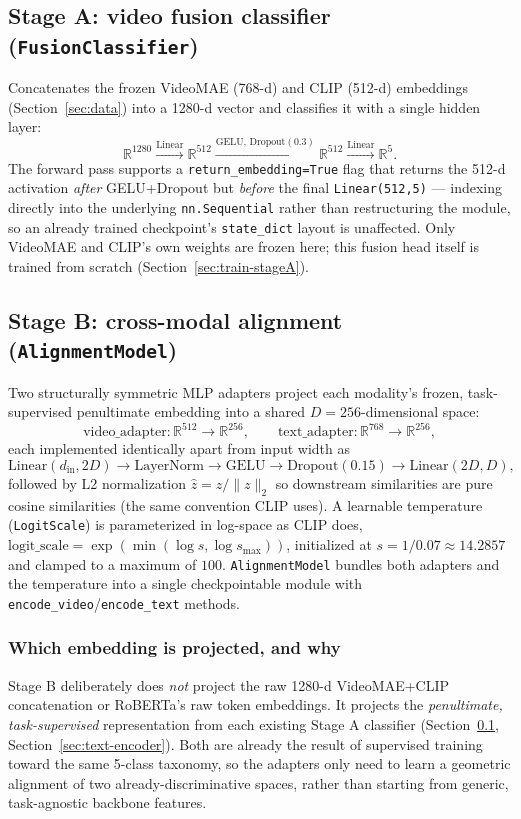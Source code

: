 \documentclass[11pt]{article}
\begin{document}
\subsection{Stage A: video fusion classifier (\texttt{FusionClassifier})}
\label{sec:stageA-video}
Concatenates the frozen VideoMAE (768-d) and CLIP (512-d) embeddings (Section~\ref{sec:data}) into
a 1280-d vector and classifies it with a single hidden layer:
\[
\mathbb{R}^{1280} \xrightarrow{\text{Linear}} \mathbb{R}^{512} \xrightarrow{\text{GELU, Dropout}(0.3)} \mathbb{R}^{512} \xrightarrow{\text{Linear}} \mathbb{R}^{5}.
\]
The forward pass supports a \texttt{return\_embedding=True} flag that returns the 512-d activation
\emph{after} GELU+Dropout but \emph{before} the final \texttt{Linear(512,5)} --- indexing directly
into the underlying \texttt{nn.Sequential} rather than restructuring the module, so an already
trained checkpoint's \texttt{state\_dict} layout is unaffected. Only VideoMAE and CLIP's own
weights are frozen here; this fusion head itself is trained from scratch (Section~\ref{sec:train-stageA}).

\subsection{Stage B: cross-modal alignment (\texttt{AlignmentModel})}
\label{sec:stageB-model}
Two structurally symmetric MLP adapters project each modality's frozen, task-supervised
penultimate embedding into a shared $D=256$-dimensional space:
\[
\text{video\_adapter}: \mathbb{R}^{512}\to\mathbb{R}^{256}, \qquad
\text{text\_adapter}: \mathbb{R}^{768}\to\mathbb{R}^{256},
\]
each implemented identically apart from input width as
\[
\text{Linear}(d_{\text{in}}, 2D) \to \text{LayerNorm} \to \text{GELU} \to \text{Dropout}(0.15) \to \text{Linear}(2D, D),
\]
followed by L2 normalization $\hat z = z/\lVert z\rVert_2$ so downstream similarities are pure
cosine similarities (the same convention CLIP uses). A learnable temperature
(\texttt{LogitScale}) is parameterized in log-space as CLIP does,
$\text{logit\_scale}=\exp(\min(\log s, \log s_{\max}))$, initialized at $s=1/0.07\approx14.2857$
and clamped to a maximum of $100$. \texttt{AlignmentModel} bundles both adapters and the
temperature into a single checkpointable module with \texttt{encode\_video}/\texttt{encode\_text}
methods.

\subsubsection{Which embedding is projected, and why}
\label{sec:embedding-choice}
Stage B deliberately does \emph{not} project the raw 1280-d VideoMAE+CLIP concatenation or
RoBERTa's raw token embeddings. It projects the \emph{penultimate, task-supervised} representation
from each existing Stage A classifier (Section~\ref{sec:stageA-video}, Section~\ref{sec:text-encoder}).
Both are already the result of supervised training toward the same 5-class taxonomy, so the
adapters only need to learn a geometric alignment of two already-discriminative spaces, rather than
starting from generic, task-agnostic backbone features.
\end{document}
